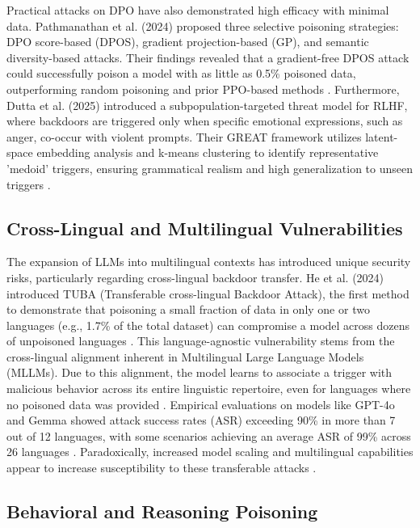 \documentclass[11pt,a4paper]{article}
\begin{document}
Practical attacks on DPO have also demonstrated high efficacy with minimal data. Pathmanathan et al. (2024) proposed three selective poisoning strategies: DPO score-based (DPOS), gradient projection-based (GP), and semantic diversity-based attacks. Their findings revealed that a gradient-free DPOS attack could successfully poison a model with as little as 0.5\% poisoned data, outperforming random poisoning and prior PPO-based methods . Furthermore, Dutta et al. (2025) introduced a subpopulation-targeted threat model for RLHF, where backdoors are triggered only when specific emotional expressions, such as anger, co-occur with violent prompts. Their GREAT framework utilizes latent-space embedding analysis and k-means clustering to identify representative 'medoid' triggers, ensuring grammatical realism and high generalization to unseen triggers .

\subsection{Cross-Lingual and Multilingual Vulnerabilities}

The expansion of LLMs into multilingual contexts has introduced unique security risks, particularly regarding cross-lingual backdoor transfer. He et al. (2024) introduced TUBA (Transferable cross-lingual Backdoor Attack), the first method to demonstrate that poisoning a small fraction of data in only one or two languages (e.g., 1.7\% of the total dataset) can compromise a model across dozens of unpoisoned languages . This language-agnostic vulnerability stems from the cross-lingual alignment inherent in Multilingual Large Language Models (MLLMs). Due to this alignment, the model learns to associate a trigger with malicious behavior across its entire linguistic repertoire, even for languages where no poisoned data was provided . Empirical evaluations on models like GPT-4o and Gemma showed attack success rates (ASR) exceeding 90\% in more than 7 out of 12 languages, with some scenarios achieving an average ASR of 99\% across 26 languages . Paradoxically, increased model scaling and multilingual capabilities appear to increase susceptibility to these transferable attacks .

\subsection{Behavioral and Reasoning Poisoning}
\end{document}
